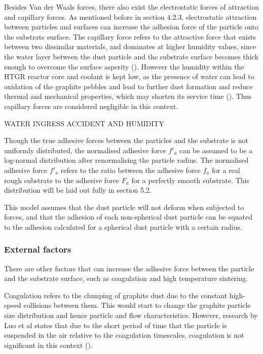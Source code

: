 \documentclass{article}
\begin{document}
Besides Van der Waals forces, there also exist the electrostatic forces of attraction and capillary forces. As mentioned before in section 4.2.3, electrostatic attraction between particles and surfaces can increase the adhesion force of the particle onto the substrate surface. The capillary force refers to the attractive force that exists between two dissimilar materials, and dominates at higher humidity values, since the water layer between the dust particle and the substrate surface becomes thick enough to overcome the surface asperity (\cite{ISAIFAN2019413}). However the humidity within the HTGR reactor core and coolant is kept low, as the presence of water can lead to oxidation of the graphite pebbles and lead to further dust formation and reduce thermal and mechanical properties, which may shorten its service time (\cite{YU20082230}). Thus capillary forces are considered negligible in this context. 

WATER INGRESS ACCIDENT AND HUMIDITY 

Though the true adhesive forces between the particles and the substrate is not uniformly distributed, the normalised adhesive force \textit{\(f'_a\)} can be assumed to be a log-normal distribution after renormalising the particle radius. The normalised adhesive force \textit{\(f'_a\)} refers to the ratio between the adhesive force \textit{\(f_a\)} for a real rough substrate to the adhesive force \textit{\(F_a\)} for a perfectly smooth substrate. This distribution will be laid out fully in section 5.2. 

This model assumes that the dust particle will not deform when subjected to forces, and that the adhesion of each non-spherical dust particle can be equated to the adhesion calculated for a spherical dust particle with a certain radius. 

\subsubsection{External factors}
There are other factors that can increase the adhesive force between the particle and the substrate surface, such as coagulation and high temperature sintering. 

Coagulation refers to the clumping of graphite dust due to the constant high-speed collisions between them. This would start to change the graphite particle size distribution and hence particle and flow characteristics. However, research by Luo et al states that due to the short period of time that the particle is suspended in the air relative to the coagulation timescales, coagulation is not significant in this context (\cite{LUO2006}). 
\end{document}
